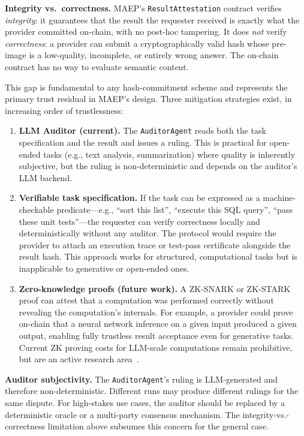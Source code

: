 \documentclass[conference]{IEEEtran}
\begin{document}
\textbf{Integrity vs.\ correctness.}
MAEP's \texttt{ResultAttestation} contract verifies \emph{integrity}:
it guarantees that the result the requester received is exactly what
the provider committed on-chain, with no post-hoc tampering.  It does
\emph{not} verify \emph{correctness}: a provider can submit a
cryptographically valid hash whose pre-image is a low-quality,
incomplete, or entirely wrong answer.  The on-chain contract has no
way to evaluate semantic content.

This gap is fundamental to any hash-commitment scheme and represents
the primary trust residual in MAEP's design.  Three mitigation
strategies exist, in increasing order of trustlessness:

\begin{enumerate}
  \item \textbf{LLM Auditor (current).}  The \texttt{AuditorAgent}
    reads both the task specification and the result and issues a
    ruling.  This is practical for open-ended tasks (e.g., text
    analysis, summarization) where quality is inherently subjective,
    but the ruling is non-deterministic and depends on the auditor's
    LLM backend.

  \item \textbf{Verifiable task specification.}  If the task can be
    expressed as a machine-checkable predicate---e.g., ``sort this
    list'', ``execute this SQL query'', ``pass these unit tests''---the
    requester can verify correctness locally and deterministically
    without any auditor.  The protocol would require the provider to
    attach an execution trace or test-pass certificate alongside the
    result hash.  This approach works for structured, computational
    tasks but is inapplicable to generative or open-ended ones.

  \item \textbf{Zero-knowledge proofs (future work).}  A ZK-SNARK or
    ZK-STARK proof can attest that a computation was performed
    correctly without revealing the computation's internals.  For
    example, a provider could prove on-chain that a neural network
    inference on a given input produced a given output, enabling fully
    trustless result acceptance even for generative tasks.  Current ZK
    proving costs for LLM-scale computations remain prohibitive, but
    are an active research area~\cite{wood2014ethereum}.
\end{enumerate}

\textbf{Auditor subjectivity.}
The \texttt{AuditorAgent}'s ruling is LLM-generated and therefore
non-deterministic.  Different runs may produce different rulings for
the same dispute.  For high-stakes use cases, the auditor should be
replaced by a deterministic oracle or a multi-party consensus
mechanism.  The integrity-vs.-correctness limitation above subsumes
this concern for the general case.
\end{document}
